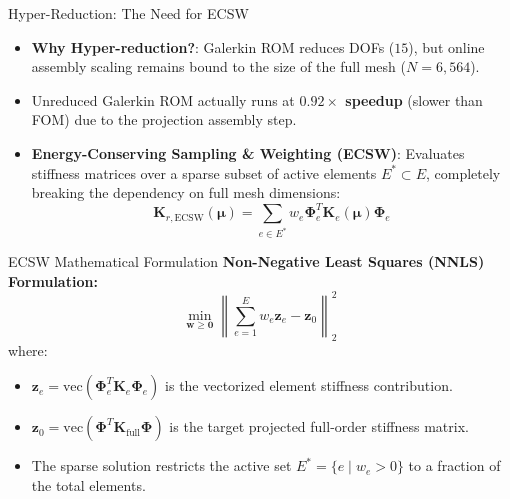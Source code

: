 \begin{frame}{Hyper-Reduction: The Need for ECSW}
    \begin{itemize}
        \item \textbf{Why Hyper-reduction?}: Galerkin ROM reduces DOFs ($15$), but online assembly scaling remains bound to the size of the full mesh ($N = 6,564$).
        \item Unreduced Galerkin ROM actually runs at \textbf{$0.92\times$ speedup} (slower than FOM) due to the projection assembly step.
        \item \textbf{Energy-Conserving Sampling \& Weighting (ECSW)}: Evaluates stiffness matrices over a sparse subset of active elements $E^* \subset E$, completely breaking the dependency on full mesh dimensions:
        \begin{equation*}
            \mathbf{K}_{r, \text{ECSW}}(\boldsymbol{\mu}) = \sum_{e \in E^*} w_e \boldsymbol{\Phi}_e^T \mathbf{K}_{e}(\boldsymbol{\mu}) \boldsymbol{\Phi}_e
        \end{equation*}
    \end{itemize}
\end{frame}

\begin{frame}{ECSW Mathematical Formulation}
    \textbf{Non-Negative Least Squares (NNLS) Formulation:}
    \begin{equation*}
        \min_{\mathbf{w} \geq \mathbf{0}} \left\| \sum_{e=1}^{E} w_e \mathbf{z}_e - \mathbf{z}_0 \right\|_2^2
    \end{equation*}
    where:
    \begin{itemize}
        \item $\mathbf{z}_e = \text{vec}(\boldsymbol{\Phi}_e^T \mathbf{K}_e \boldsymbol{\Phi}_e)$ is the vectorized element stiffness contribution.
        \item $\mathbf{z}_0 = \text{vec}(\boldsymbol{\Phi}^T \mathbf{K}_{\text{full}} \boldsymbol{\Phi})$ is the target projected full-order stiffness matrix.
        \item The sparse solution restricts the active set $E^* = \{ e \mid w_e > 0 \}$ to a fraction of the total elements.
    \end{itemize}
\end{frame}


